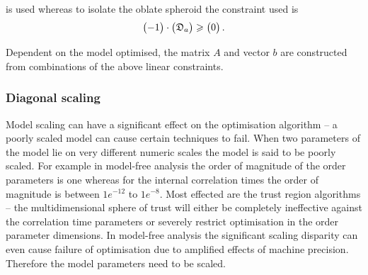 \begin{htmlonly}
\begin{htmlonly}
\noindent is used whereas to isolate the oblate spheroid the constraint used is
\begin{equation}
    \begin{pmatrix}
         -1 \\
    \end{pmatrix}
    \cdot
    \begin{pmatrix}
        \mathfrak{D}_a \\
    \end{pmatrix}
    \geqslant
    \begin{pmatrix}
        0 \\
    \end{pmatrix}.
\end{equation}

Dependent on the model optimised, the matrix $A$ and vector $b$ are constructed from combinations of the above linear constraints.




\subsubsection{Diagonal scaling} \label{sect: diagonal scaling}

Model scaling can have a significant effect on the optimisation algorithm -- a poorly scaled model can cause certain techniques to fail.  When two parameters of the model lie on very different numeric scales the model is said to be poorly scaled.  For example in model-free analysis the order of magnitude of the order parameters is one whereas for the internal correlation times the order of magnitude is between $1e^{-12}$ to $1e^{-8}$.  Most effected are the trust region algorithms -- the multidimensional sphere of trust will either be completely ineffective against the correlation time parameters or severely restrict optimisation in the order parameter dimensions.  In model-free analysis the significant scaling disparity can even cause failure of optimisation due to amplified effects of machine precision.  Therefore the model parameters need to be scaled.


\end{htmlonly}
\end{htmlonly}
